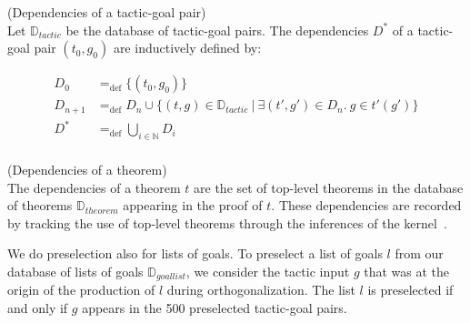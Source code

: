 \documentclass[runningheads,a4paper,draft]{svjour3}
\begin{document}
\begin{definition}\label{def:tacdep}(Dependencies of a tactic-goal pair)\\
Let $\mathbb{D}_{\mathit{tactic}}$ be the database of tactic-goal pairs.
The dependencies $D^*$ of a tactic-goal pair $(t_0,g_0)$ are
inductively defined by:

\begin{align*}
D_0 &=_{\mathrm{def}} \lbrace (t_0,g_0) \rbrace \\
D_{n+1} &=_{\mathrm{def}} D_n \cup \lbrace (t,g)\in 
\mathbb{D}_{\mathit{tactic}}\  |\ \exists
(t',g') \in D_n.\ g \in t'(g') \rbrace  \\
D^* &=_{\mathrm{def}} \bigcup_{i \in \mathbb{N}} D_i\\
\end{align*}
\end{definition}


\begin{definition}\label{def:thmdep}(Dependencies of a theorem)\\
The dependencies of a theorem $t$ are the set of top-level theorems in
the database of theorems $\mathbb{D}_{\mathit{theorem}}$ appearing in the proof 
of $t$. These 
dependencies are recorded by tracking the use of top-level theorems through the 
inferences of the
kernel~\cite{tgck-cpp15}.
\end{definition}


We do preselection also for lists of goals.
To preselect a list of goals $l$ from our database of lists of goals 
$\mathbb{D}_{\mathit{goallist}}$, we
consider the tactic input $g$ that was at the origin of the production of $l$
during orthogonalization. The list $l$ is preselected if and only if $g$
appears in the 500 preselected tactic-goal pairs.
\end{document}
